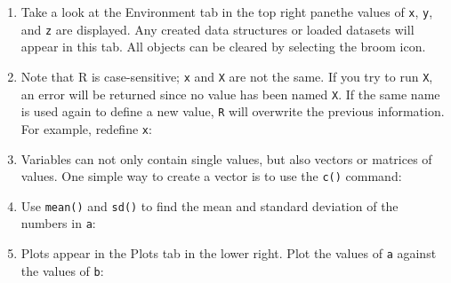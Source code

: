 \documentclass[letterpaper,12pt,twoside,]{pinp}
\begin{document}
\begin{enumerate}
\begin{Shaded}
\begin{Highlighting}[]
\StringTok{ }\OperatorTok{*}\StringTok{ }
\end{Highlighting}
\end{Shaded}
\item
  Take a look at the Environment tab in the top right
  pane\textemdash the values of \texttt{x}, \texttt{y}, and \texttt{z}
  are displayed. Any created data structures or loaded datasets will
  appear in this tab. All objects can be cleared by selecting the broom
  icon.
\item
  Note that \textsf{R} is case-sensitive; \texttt{x} and \texttt{X} are
  not the same. If you try to run \texttt{X}, an error will be returned
  since no value has been named \texttt{X}. If the same name is used
  again to define a new value, \texttt{R} will overwrite the previous
  information. For example, redefine \texttt{x}:

\begin{Shaded}
\begin{Highlighting}[]
\StringTok{ } \OperatorTok{+}\StringTok{ }
\StringTok{ }
\end{Highlighting}
\end{Shaded}
\item
  Variables can not only contain single values, but also vectors or
  matrices of values. One simple way to create a vector is to use the
  \texttt{c()} command:

\begin{Shaded}
\begin{Highlighting}[]
\StringTok{ }\NormalTok{(}\NormalTok{, }\NormalTok{, }\NormalTok{, }
\StringTok{ }\OperatorTok{*}
\end{Highlighting}
\end{Shaded}
\item
  Use \texttt{mean()} and \texttt{sd()} to find the mean and standard
  deviation of the numbers in \texttt{a}:

\begin{Shaded}
\begin{Highlighting}[]
\end{Highlighting}
\end{Shaded}
\item
  Plots appear in the Plots tab in the lower right. Plot the values of
  \texttt{a} against the values of \texttt{b}:


\end{enumerate}
\end{document}

